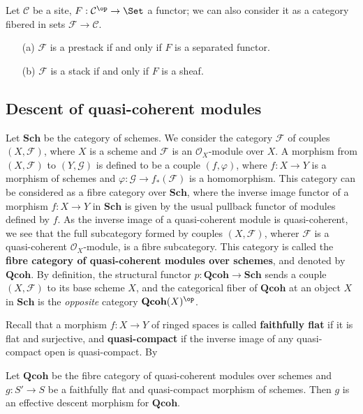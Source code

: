 \begin{proposition}\label{descent fibre cat of presheaf stack iff sheaf}
Let $\mathcal{C}$ be a site, $F:\mathcal{C}^{\op}\to\Set$ a functor; we can also consider it as a category fibered in sets $\mathcal{F}\to\mathcal{C}$.
\begin{enumerate}
    \item[(a)] $\mathcal{F}$ is a prestack if and only if $F$ is a separated functor.
    \item[(b)] $\mathcal{F}$ is a stack if and only if $F$ is a sheaf.
\end{enumerate}
\end{proposition}


\subsection{Descent of quasi-coherent modules}
Let $\mathbf{Sch}$ be the category of schemes. We consider the category $\mathcal{F}$ of couples $(X,\mathscr{F})$, where $X$ is a scheme and $\mathscr{F}$ is an $\mathscr{O}_X$-module over $X$. A morphism from $(X,\mathscr{F})$ to $(Y,\mathscr{G})$ is defined to be a couple $(f,\varphi)$, where $f:X\to Y$ is a morphism of schemes and $\varphi:\mathscr{G}\to f_*(\mathscr{F})$ is a homomorphism. This category can be considered as a fibre category over $\mathbf{Sch}$, where the inverse image functor of a morphism $f:X\to Y$ in $\mathbf{Sch}$ is given by the usual pullback functor of modules defined by $f$. As the inverse image of a quasi-coherent module is quasi-coherent, we see that the full subcategory formed by couples $(X,\mathscr{F})$, wherer $\mathscr{F}$ is a quasi-coherent $\mathscr{O}_X$-module, is a fibre subcategory. This category is called the \textbf{fibre category of quasi-coherent modules over schemes}, and denoted by $\mathbf{Qcoh}$. By definition, the structural functor $p:\mathbf{Qcoh}\to \mathbf{Sch}$ sends a couple $(X,\mathscr{F})$ to its base scheme $X$, and the categorical fiber of $\mathbf{Qcoh}$ at an object $X$ in $\mathbf{Sch}$ is the \textit{opposite} category $\mathbf{Qcoh}(X)^{\op}$.\par
Recall that a morphism $f:X\to Y$ of ringed spaces is called \textbf{faithfully flat} if it is flat and surjective, and \textbf{quasi-compact} if the inverse image of any quasi-compact open is quasi-compact. By 
\begin{theorem}
Let $\mathbf{Qcoh}$ be the fibre category of quasi-coherent modules over schemes and $g:S'\to S$ be a faithfully flat and quasi-compact morphism of schemes. Then $g$ is an effective descent morphism for $\mathbf{Qcoh}$.
\end{theorem}


